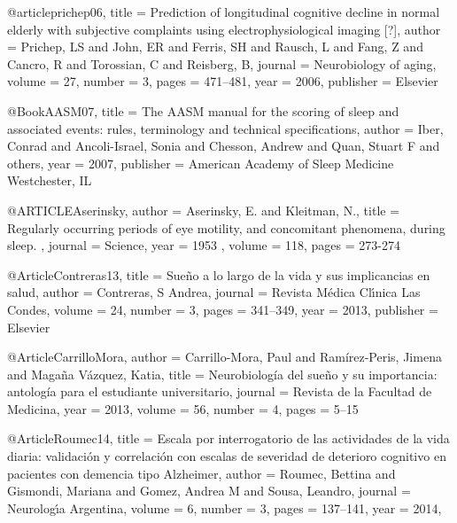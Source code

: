 @article{prichep06,
    title   = {Prediction of longitudinal cognitive decline in normal elderly with subjective 
               complaints using electrophysiological imaging [?]},
    author  = {Prichep, LS 
               and John, ER 
               and Ferris, SH 
               and Rausch, L 
               and Fang, Z 
               and Cancro, R 
               and Torossian, C 
               and Reisberg, B},
    journal = {Neurobiology of aging},
    volume  = {27},
    number  = {3},
    pages   = {471--481},
    year    = {2006},
    publisher = {Elsevier}
}

@Book{AASM07,
    title     = {The AASM manual for the scoring of sleep and associated events: rules, 
                 terminology and technical specifications},
    author    = {Iber, Conrad 
                 and Ancoli-Israel, Sonia 
                 and Chesson, Andrew 
                 and Quan, Stuart F 
                 and others},
    year      = {2007},
    publisher = {American Academy of Sleep Medicine Westchester, IL}
}

@ARTICLE{Aserinsky,
author = {Aserinsky, E. and Kleitman, N.},
title = {Regularly occurring periods of eye motility, and concomitant phenomena, during sleep. },
journal = {Science},
year = {1953 },
volume = {118},
pages = {273-274 }
}

@Article{Contreras13,
    title   = {Sue{\~n}o a lo largo de la vida y sus implicancias en salud},
    author  = {Contreras, S Andrea},
    journal = {Revista M{\'e}dica Cl{\'\i}nica Las Condes},
    volume  = {24},
    number  = {3},
    pages   = {341--349},
    year    = {2013},
    publisher = {Elsevier}
}

@Article{CarrilloMora,
    author  = {Carrillo-Mora, Paul 
               and Ram\'irez-Peris, Jimena 
               and Maga\~na V\'azquez, Katia},
    title   = {Neurobiolog\'ia del sue\~no y su importancia: antolog\'ia para el 
               estudiante universitario},
    journal = {Revista de la {F}acultad de {M}edicina},
    year    = {2013},
    volume  = {56},
    number  = {4},
    pages   = {5--15}
}

@Article{Roumec14,
    title   = {Escala por interrogatorio de las actividades de la vida diaria: validaci{\'o}n y 
               correlaci{\'o}n con escalas de severidad de deterioro cognitivo en pacientes con 
               demencia tipo {A}lzheimer},
    author  = {Roumec, Bettina 
               and Gismondi, Mariana 
               and Gomez, Andrea M 
               and Sousa, Leandro},
    journal = {Neurolog{\'\i}a {A}rgentina},
    volume  = {6},
    number  = {3},
    pages   = {137--141},
    year    = {2014},
}

